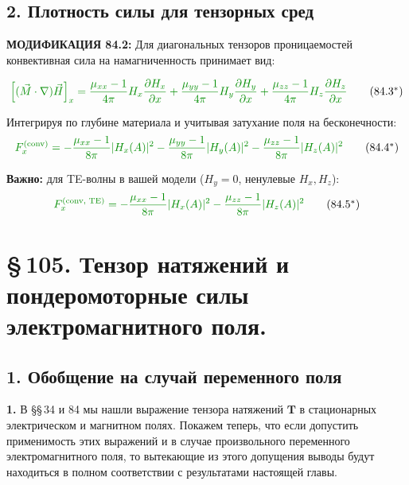 \documentclass[a4paper,12pt]{article}
\newcommand{\modtext}[1]{\textcolor{modcolor}{#1}}
\newcommand{\modmath}[1]{\textcolor{modcolor}{#1}}
\newcommand{\modblock}[1]{\colorbox{modcolor!10}{\parbox{\dimexpr\linewidth-2\fboxsep}{#1}}}
\begin{document}
\subsection*{2. Плотность силы для тензорных сред}

\modtext{
\textbf{МОДИФИКАЦИЯ 84.2:} Для диагональных тензоров проницаемостей конвективная
сила на намагниченность принимает вид:
}

\begin{equation}
\modmath{
\left[(\vec{M}\cdot\nabla)\vec{H}\right]_x =
\frac{\mu_{xx} - 1}{4\pi}H_x\frac{\partial H_x}{\partial x} +
\frac{\mu_{yy} - 1}{4\pi}H_y\frac{\partial H_y}{\partial x} +
\frac{\mu_{zz} - 1}{4\pi}H_z\frac{\partial H_z}{\partial x}
}
\tag{84.3$^*$}
\end{equation}

Интегрируя по глубине материала и учитывая затухание поля на бесконечности:
\begin{equation}
\modmath{
F_x^{(\text{conv})} =
-\frac{\mu_{xx} - 1}{8\pi}|H_x(A)|^2
-\frac{\mu_{yy} - 1}{8\pi}|H_y(A)|^2
-\frac{\mu_{zz} - 1}{8\pi}|H_z(A)|^2
}
\tag{84.4$^*$}
\end{equation}

\textbf{Важно:} для TE-волны в вашей модели ($H_y = 0$, ненулевые $H_x, H_z$):
\begin{equation}
\modmath{
F_x^{(\text{conv, TE})} =
-\frac{\mu_{xx} - 1}{8\pi}|H_x(A)|^2
-\frac{\mu_{zz} - 1}{8\pi}|H_z(A)|^2
}
\tag{84.5$^*$}
\end{equation}


\section*{\S\,105. Тензор натяжений и пондеромоторные силы электромагнитного поля.}

\subsection*{1. Обобщение на случай переменного поля}

\noindent
\textbf{1.} В §§\,34 и 84 мы нашли выражение тензора натяжений
$\mathbf{T}$ в стационарных электрическом и магнитном полях. Покажем
теперь, что если допустить применимость этих выражений и в случае
произвольного переменного электромагнитного поля, то вытекающие из
этого допущения выводы будут находиться в полном соответствии с
результатами настоящей главы.
\end{document}
